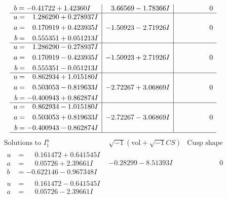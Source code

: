 \documentclass[1p]{elsarticle_modified}
\theoremstyle{definition}
\newcommand{\I}{\sqrt{-1}}
\begin{document}
$$\begin{array}{c|c|c}
\begin{aligned}
b &= -0.41722 + 1.42360 I\end{aligned}
 & \phantom{-}3.66569 - 1.78366 I & \phantom{-0.000000 } 0 \\ \hline\begin{aligned}
u &= \phantom{-}1.286290 + 0.278937 I \\
a &= \phantom{-}0.170919 + 0.423935 I \\
b &= \phantom{-}0.555351 + 0.051213 I\end{aligned}
 & -1.50923 - 2.71926 I & \phantom{-0.000000 } 0 \\ \hline\begin{aligned}
u &= \phantom{-}1.286290 - 0.278937 I \\
a &= \phantom{-}0.170919 - 0.423935 I \\
b &= \phantom{-}0.555351 - 0.051213 I\end{aligned}
 & -1.50923 + 2.71926 I & \phantom{-0.000000 } 0 \\ \hline\begin{aligned}
u &= \phantom{-}0.862934 + 1.015180 I \\
a &= \phantom{-}0.503053 - 0.819633 I \\
b &= -0.400943 + 0.862874 I\end{aligned}
 & -2.72267 + 3.06869 I & \phantom{-0.000000 } 0 \\ \hline\begin{aligned}
u &= \phantom{-}0.862934 - 1.015180 I \\
a &= \phantom{-}0.503053 + 0.819633 I \\
b &= -0.400943 - 0.862874 I\end{aligned}
 & -2.72267 - 3.06869 I & \phantom{-0.000000 } 0\\
 \hline 
 \end{array}$$\newpage$$\begin{array}{c|c|c}  
\text{Solutions to }I^u_{1}& \I (\text{vol} + \sqrt{-1}CS) & \text{Cusp shape}\\
 \hline 
\begin{aligned}
u &= \phantom{-}0.161472 + 0.641545 I \\
a &= \phantom{-}0.05726 + 2.39661 I \\
b &= -0.622146 - 0.967348 I\end{aligned}
 & -0.28299 - 8.51393 I & \phantom{-0.000000 } 0 \\ \hline\begin{aligned}
u &= \phantom{-}0.161472 - 0.641545 I \\
a &= \phantom{-}0.05726 - 2.39661 I \\

\end{aligned}
\end{array}$$
\end{document}
